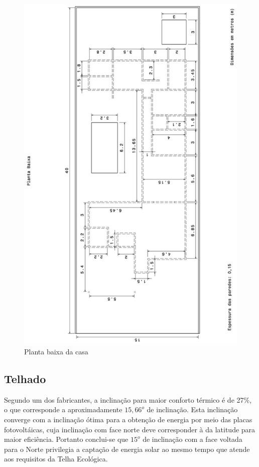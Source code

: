 \begin{figure}[H]
  \begin{center}
	\includegraphics[keepaspectratio,scale=0.45,angle=270]{figuras/planta_baixa.eps}
	\caption{Planta baixa da casa}
  \end{center}
\end{figure}


\subsection{Telhado}

Segundo um dos fabricantes, a inclinação para maior conforto térmico é de 27\%, o que corresponde a aproximadamente $15,66^o$ de inclinação. Esta inclinação converge com a inclinação ótima para a obtenção de energia por meio das placas fotovoltáicas, cuja inclinação com face norte deve corresponder à da latitude para maior eficiência. Portanto conclui-se que $15^o$ de inclinação com a face voltada para o Norte privilegia a captação de energia solar ao mesmo tempo que atende aos requisitos da Telha Ecológica.

